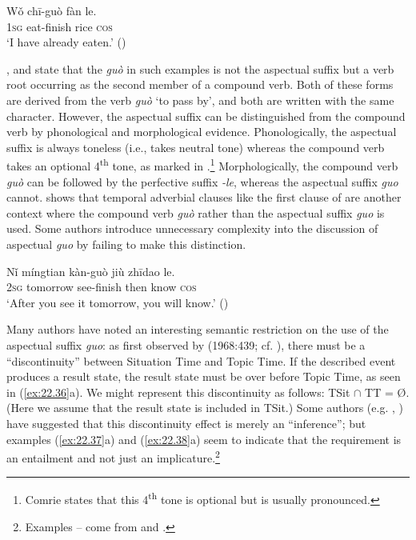 \ea \label{ex:22.34}
\gll Wǒ  chī-guò  fàn  le.\\
\textsc{1sg}  eat-finish  rice  \textsc{cos}{\footnotemark}\\
\glt ‘I have already eaten.’  (\citealt{Ma1977})
\z
{}

\citet[251]{Chao1968}, \citet[59]{Comrie1976} and \citet[139ff.]{XiaoMcEnery2004} state that the \textit{guò} in such examples is not the aspectual suffix but a verb root occurring as the second member of a compound verb. Both of these forms are derived from the verb \textit{guò} ‘to pass by’, and both are written with the same  character. However, the aspectual suffix can be distinguished from the compound verb by phonological and morphological evidence. Phonologically, the aspectual suffix is always toneless (i.e., takes neutral tone) whereas the compound verb takes an optional 4\textsuperscript{th} tone, as marked in .\footnote{Comrie states that this 4\textsuperscript{th} tone is optional but is usually pronounced.} Morphologically, the compound verb \textit{guò} can be followed by the perfective suffix \textit{-le}, whereas the aspectual suffix \textit{guo} cannot. \citet[39--40]{Chu1998} shows that temporal adverbial clauses like the first clause of  are another context where the compound verb \textit{guò} rather than the aspectual suffix \textit{guo} is used. Some authors introduce unnecessary complexity into the discussion of aspectual \textit{guo} by failing to make this distinction.


\ea \label{ex:22.35}
\gll Nǐ  míngtian  kàn-guò  jiù  zhīdao  le.\\
\textsc{2sg}  tomorrow  see-finish  then  know  \textsc{cos}\\
\glt ‘After you see it tomorrow, you will know.’  (\citealt{Chen1979})
\z


Many authors have noted an interesting semantic restriction on the use of the aspectual suffix \textit{guo}: as first observed by \citeauthor{Chao1968} (1968:439; cf. \citealt{Yeh1996}), there must be a “discontinuity” between Situation Time and Topic Time. If the described event produces a result state, the result state must be over before Topic Time, as seen in (\ref{ex:22.36}a). We might represent this discontinuity as follows: TSit ${\cap}$ TT = \O. (Here we assume that the result state is included in TSit.) Some authors (e.g. \citealt{Iljic1990}, \citealt{Yeh1996}) have suggested that this discontinuity effect is merely an “inference”; but examples (\ref{ex:22.37}a) and (\ref{ex:22.38}a) seem to indicate that the requirement is an entailment and not just an implicature.\footnote{Examples -- come from \citet[18, 25]{Ma1977} and \citet{Chao1968}.}


